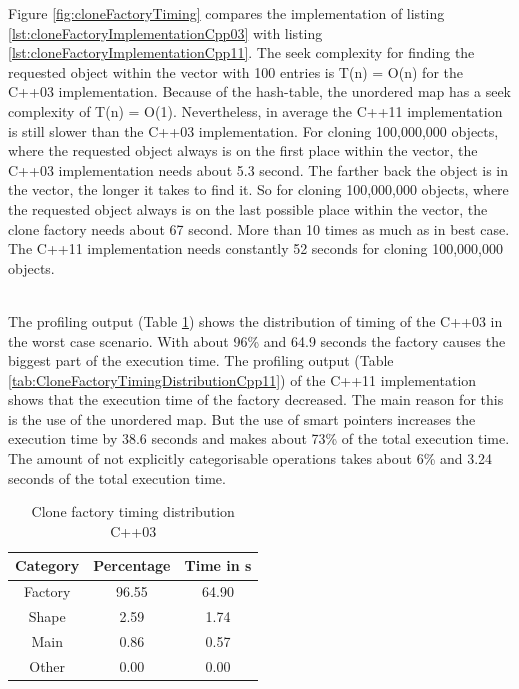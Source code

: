 {\noindent Figure \ref{fig:cloneFactoryTiming} compares the implementation of listing \ref{lst:cloneFactoryImplementationCpp03} with listing \ref{lst:cloneFactoryImplementationCpp11}. The seek complexity for finding the requested object within the vector with 100 entries is T(n) = O(n) for the C++03 implementation. Because of the hash-table, the unordered map has a seek complexity of T(n) = O(1). Nevertheless, in average the C++11 implementation is still slower than the C++03 implementation. For cloning 100,000,000 objects, where the requested object always is on the first place within the vector, the C++03 implementation needs about 5.3 second. The farther back the object is in the vector, the longer it takes to find it. So for cloning 100,000,000 objects, where the requested object always is on the last possible place within the vector, the clone factory needs about 67 second. More than 10 times as much as in best case. The C++11 implementation needs constantly 52 seconds for cloning 100,000,000 objects.

\noindent\\ The profiling output (Table \ref{tab:CloneFactoryTimingDistributionCpp03}) shows the distribution of timing of the C++03 in the worst case scenario. With about 96\% and 64.9 seconds the factory causes the biggest part of the execution time. The profiling output (Table \ref{tab:CloneFactoryTimingDistributionCpp11}) of the C++11 implementation shows that the execution time of the factory decreased. The main reason for this is the use of the unordered map. But the use of smart pointers increases the execution time by 38.6 seconds and makes about 73\% of the total execution time. The amount of not explicitly categorisable operations takes about 6\% and 3.24 seconds of the total execution time.

\begin{table}[h]\begin{center}
\begin{tabular}{|c|c|c|}\hline
\textbf{Category} & \textbf{Percentage} & \textbf{Time in s}\\
\hline
Factory & 96.55 & 64.90\\
\hline
Shape & 2.59 & 1.74\\
\hline
Main & 0.86 & 0.57\\
\hline
Other & 0.00 & 0.00\\
\hline
\end{tabular}
\caption{Clone factory timing distribution C++03}
\label{tab:CloneFactoryTimingDistributionCpp03}
\end{center}\end{table}

}
